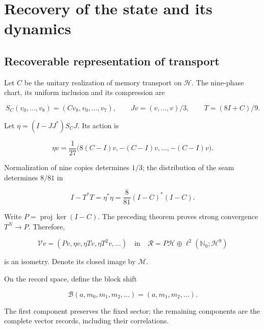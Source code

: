 \chapter{Recovery of the state and its dynamics}
\label{x_reciprocidad:nuclear:3}
\section{Recoverable representation of transport}

Let \(C\) be the unitary realization of memory transport on \(\mathcal H\). The nine-phase chart, its uniform inclusion and its compression are

\[
S_C(v_0,\ldots,v_8)=(Cv_8,v_0,\ldots,v_7),\qquad
Jv=(v,\ldots,v)/3,\qquad T=(8I+C)/9.
\]

Let \(\eta=(I-JJ^*)S_CJ\). Its action is

\[
\eta v=\frac1{27}\bigl(8(C-I)v,-(C-I)v,\ldots,-(C-I)v\bigr).
\]

Normalization of nine copies determines \(1/3\); the distribution of the seam determines \(8/81\) in

\begin{equation}
I-T^*T=\eta^*\eta=\frac8{81}(I-C)^*(I-C).
\label{x_reciprocidad:nuc03:eq:1}
\end{equation}

Write \(P=\operatorname{proj}\ker(I-C)\). The preceding theorem proves strong convergence \(T^N\to P\). Therefore,

\begin{equation}
\mathcal Vv=(Pv,\eta v,\eta Tv,\eta T^2v,\ldots)
\quad\text{in}\quad
\mathcal R=P\mathcal H\oplus\ell^2(\mathbb N_0;\mathcal H^9)
\label{x_reciprocidad:nuc03:eq:2}
\end{equation}

is an isometry. Denote its closed image by \(\mathcal M\).

On the record space, define the block shift

\begin{equation}
\mathcal B(a,m_0,m_1,m_2,\ldots)=(a,m_1,m_2,\ldots).
\label{x_reciprocidad:nuc03:eq:3}
\end{equation}

The first component preserves the fixed sector; the remaining components are the complete vector records, including their correlations.

